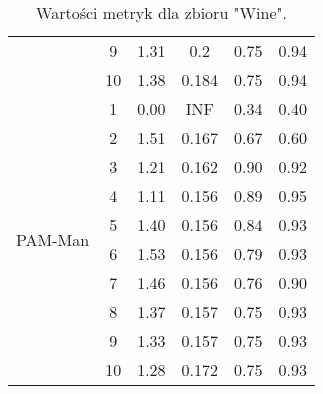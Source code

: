 \begin{table}[H]
\begin{tabular}{cc|cccc}
  & 9 & 1.31 & 0.2 & 0.75 & 0.94 \\ 
  & 10 & 1.38 & 0.184 & 0.75 & 0.94 \\ \hline \hline 
  \multirow{10}{*}{PAM-Man} & 1 & 0.00 & INF & 0.34 & 0.40 \\ 
  & 2 & 1.51 & 0.167 & 0.67 & 0.60 \\ 
  & 3 & 1.21 & 0.162 & 0.90 & 0.92 \\ 
  & 4 & 1.11 & 0.156 & 0.89 & 0.95 \\ 
  & 5 & 1.40 & 0.156 & 0.84 & 0.93 \\ 
  & 6 & 1.53 & 0.156 & 0.79 & 0.93 \\ 
  & 7 & 1.46 & 0.156 & 0.76 & 0.90 \\ 
  & 8 & 1.37 & 0.157 & 0.75 & 0.93 \\ 
  & 9 & 1.33 & 0.157 & 0.75 & 0.93 \\ 
  & 10 & 1.28 & 0.172 & 0.75 & 0.93 \\ 
   \hline
\end{tabular}
  \caption{Wartości metryk dla zbioru "Wine".}
\end{table}
